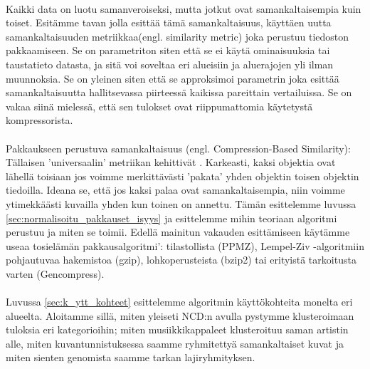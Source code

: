 \documentclass[11pt,finnish]{tktltiki2}
\theoremstyle{definition}
\theoremstyle{remark}
\begin{document}
\paragraph{} %
\label{par:intro-1}
  Kaikki data on luotu samanveroiseksi, mutta jotkut ovat samankaltaisempia kuin toiset. Esitämme tavan jolla esittää tämä samankaltaisuus, käyttäen uutta samankaltaisuuden metriikkaa(engl. similarity metric) joka perustuu tiedoston pakkaamiseen. Se on parametriton siten että se ei käytä ominaisuuksia tai taustatieto datasta, ja sitä voi soveltaa eri alueisiin ja aluerajojen yli ilman muunnoksia. Se on yleinen siten että se approksimoi parametrin joka esittää samankaltaisuutta hallitsevassa piirteessä kaikissa pareittain vertailuissa. Se on vakaa siinä mielessä, että sen tulokset ovat riippumattomia käytetystä kompressorista.


\paragraph{} %
\label{par:intro-2}
  Pakkaukseen perustuva samankaltaisuus (engl. Compression-Based Similarity): Tällaisen 'universaalin' metriikan kehittivät \cite{CV05}. Karkeasti, kaksi objektia ovat lähellä toisiaan jos voimme merkittävästi 'pakata' yhden objektin toisen objektin tiedoilla. Ideana se, että jos kaksi palaa ovat samankaltaisempia, niin voimme ytimekkäästi kuvailla yhden kun toinen on annettu. Tämän esittelemme luvussa \ref{sec:normalisoitu_pakkauset_isyys} ja esittelemme mihin teoriaan algoritmi perustuu ja miten se toimii. Edellä mainitun vakauden esittämiseen käytämme useaa tosielämän pakkausalgoritmi': tilastollista (PPMZ), Lempel-Ziv -algoritmiin pohjautuvaa hakemistoa (gzip), lohkoperusteista (bzip2) tai erityistä tarkoitusta varten (Gencompress).


\paragraph{} %
\label{par:intro-3}
  Luvussa \ref{sec:k_ytt_kohteet} esittelemme algoritmin käyttökohteita monelta eri alueelta. Aloitamme sillä, miten yleiseti NCD:n avulla pystymme klusteroimaan tuloksia eri kategorioihin; miten musiikkikappaleet klusteroituu saman artistin alle, miten kuvantunnistuksessa saamme ryhmitettyä samankaltaiset kuvat ja miten sienten genomista saamme tarkan lajiryhmityksen.
\end{document}
